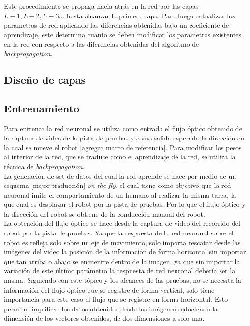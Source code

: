 \documentclass{iccmemoria}
\begin{document}
Este procedimiento se propaga hacia atrás en la red por las capas $L-1, L-2, L-3...$ hasta alcanzar la primera capa. Para luego actualizar los parametros de red aplicando las diferencias obtenidas bajo un coeficiente de aprendizaje, este determina cuanto se deben modificar los parametros existentes en la red con respecto a las diferencias obtenidas del algoritmo de \emph{backpropagation}.

\subsection{Diseño de capas}

\subsection{Entrenamiento}

Para entrenar la red neuronal se utiliza como entrada el flujo óptico obtenido de la captura de video de la pista de pruebas y como salida esperada la dirección en la cual se mueve el robot [agregar marco de referencia]. Para modificar los pesos al interior de la red, que se traduce como el aprendizaje de la red, se utiliza la técnica de \emph{backpropagation}.\\

La generación de set de datos del cual la red aprende se hace por medio de un esquema [mejor traducción] \emph{on-the-fly}, el cual tiene como objetivo que la red neuronal imite el comportamiento de un humano al realizar la misma tarea, la que cual es desplazar el robot por la pista de pruebas. Por lo que el flujo óptico y la dirección del robot se obtiene de la conducción manual del robot.\\

La obtención del flujo óptico se hace desde la captura de video del recorrido del robot por la pista de pruebas. Ya que la respuesta de la red neuronal sobre el robot es refleja solo sobre un eje de movimiento, solo importa rescatar desde las imágenes del video la posición de la información de forma horizontal sin importar que tan arriba o abajo se encuentre dentro de la imagen, ya que sin importar la variación de este último parámetro la respuesta de red neuronal debería ser la misma.
Siguiendo con este tópico y los alcances de las pruebas, no se necesita la información del flujo óptico que se registre de forma vertical, solo tiene importancia para este caso el flujo que se registre en forma horizontal. Esto permite simplificar los datos obtenidos desde las imágenes reduciendo la dimensión de los vectores obtenidos, de dos dimensiones a solo una.\\
\end{document}
